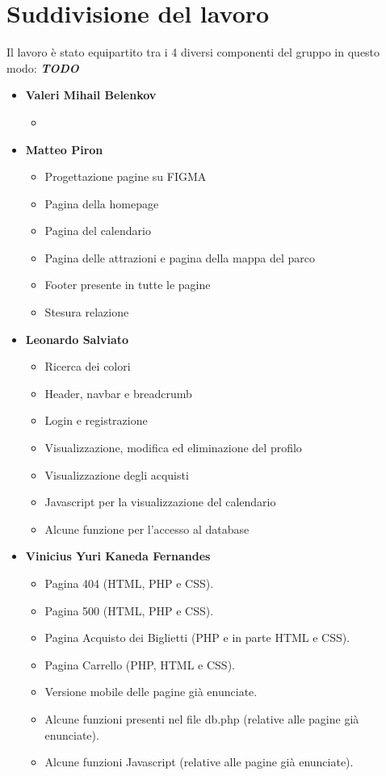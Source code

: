 \section{Suddivisione del lavoro}
Il lavoro è stato equipartito tra i 4 diversi componenti del gruppo in questo modo:
\textbf{\textit{TODO}}
\begin{itemize}
    \item \textbf{Valeri Mihail Belenkov}
        \begin{itemize}
            \item 
        \end{itemize}
    \item \textbf{Matteo Piron}
        \begin{itemize}
            \item Progettazione pagine su FIGMA
            \item Pagina della homepage
            \item Pagina del calendario
            \item Pagina delle attrazioni e pagina della mappa del parco
            \item Footer presente in tutte le pagine
            \item Stesura relazione
        \end{itemize}
    \item \textbf{Leonardo Salviato}
        \begin{itemize}
            \item Ricerca dei colori
            \item Header, navbar e breadcrumb
            \item Login e registrazione
            \item Visualizzazione, modifica ed eliminazione del profilo
            \item Visualizzazione degli acquisti
            \item Javascript per la visualizzazione del calendario
            \item Alcune funzione per l'accesso al database
        \end{itemize}
    \item \textbf{Vinicius Yuri Kaneda Fernandes}
        \begin{itemize}
            \item Pagina 404 (HTML, PHP e CSS).
            \item Pagina 500 (HTML, PHP e CSS).
            \item Pagina Acquisto dei Biglietti (PHP e in parte HTML e CSS).
            \item Pagina Carrello (PHP, HTML e CSS).
            \item Versione mobile delle pagine già enunciate.
            \item Alcune funzioni presenti nel file db.php (relative alle pagine già enunciate).
            \item Alcune funzioni Javascript (relative alle pagine già enunciate).
        \end{itemize}
\end{itemize}